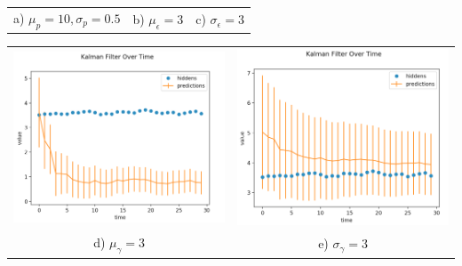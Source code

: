 \documentclass[submit]{harvardml}
\begin{document}
\begin{enumerate}
\begin{center}
\begin{tabular}{ c c c }
 a) $\mu_p = 10, \sigma_p = 0.5$ & b) $\mu_\epsilon = 3$ & c) $\sigma_\epsilon = 3$ 
\end{tabular}
\end{center}

\begin{center}
\begin{tabular}{ c c }
 \includegraphics[scale=0.25]{d.png} & \includegraphics[scale=0.25]{e.png} \\ 
 d) $\mu_\gamma = 3$ & e) $\sigma_\gamma = 3$
\end{tabular}
\end{center}


\end{enumerate}
\end{document}
